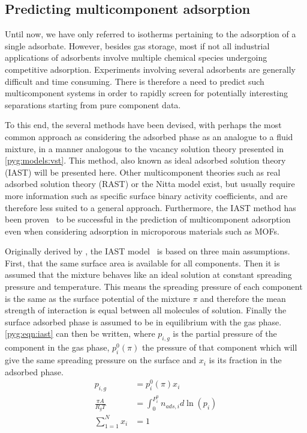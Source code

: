 
\subsection{Predicting multicomponent adsorption}\label{pyg:iast}

Until now, we have only referred to isotherms pertaining to the adsorption
of a single adsorbate. However, besides gas storage, most if not all
industrial applications of adsorbents involve multiple chemical
species undergoing competitive adsorption. Experiments involving
several adsorbents are generally difficult and time consuming.
There is therefore a need to predict such multicomponent systems
in order to rapidly screen for potentially interesting separations
starting from pure component data.

To this end, the several methods have been devised, with perhaps
the most common approach as considering the adsorbed phase as
an analogue to a fluid mixture, in a manner analogous to the
vacancy solution theory presented in \autoref{pyg:models:vst}.
This method, also known as ideal adsorbed solution theory (IAST)
will be presented here. Other multicomponent theories
such as real adsorbed solution theory (RAST) or the Nitta model
exist, but usually require more information such as specific
surface binary activity coefficients, and are therefore less suited to
a general approach. Furthermore, the IAST method has been
proven~\cite{cessfordEvaluationIdealAdsorbed2012,%
	vanheestIdentificationMetalOrganic2012} to be successful in the
prediction of multicomponent adsorption even when considering
adsorption in microporous materials such as MOFs.

Originally derived by \citeauthor{myersThermodynamicsMixedgasAdsorption1965},
the IAST model~\cite{myersThermodynamicsMixedgasAdsorption1965} is based
on three main assumptions. First, that the
same surface area is available for all components. Then it is
assumed that the mixture behaves like an ideal solution at constant
spreading pressure and temperature. This means the spreading pressure of
each component is the same as the surface potential of the mixture \(\pi\)
and therefore the mean strength of interaction is equal between all
molecules of solution. Finally the surface adsorbed phase is assumed
to be in equilibrium with the gas phase. \autoref{pyg:eqn:iast}
can then be written, where \(p_{i,g}\) is the partial pressure of
the component in the gas phase, \( p_i^0(\pi)\) the pressure of
that component which will give the same spreading pressure on the
surface and \(x_i\) is its fraction in the adsorbed phase.
%
\begin{align}
	p_{i,g}             & = p_i^0(\pi)x_i                              %
	\label{pyg:eqn:iast}                                               \\
	\frac{\pi A}{R_g T} & = \int_{0}^{P_{i}^{0}} n_{ads,i} d\ln{(p_i)} %
	\label{pyg:eqn:iast-2}                                             \\
	\sum_{1=1}^{N} x_i  & = 1                                          %
	\label{pyg:eqn:iast-3}
\end{align}

